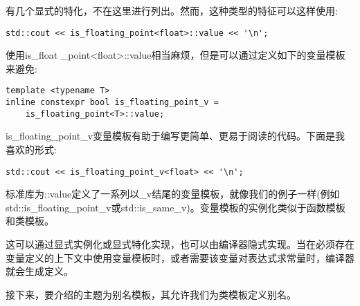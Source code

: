 有几个显式的特化，不在这里进行列出。然而，这种类型的特征可以这样使用:

\begin{lstlisting}[style=styleCXX]
std::cout << is_floating_point<float>::value << '\n';
\end{lstlisting}

使用is\_float \_point<float>::value相当麻烦，但是可以通过定义如下的变量模板来避免:

\begin{lstlisting}[style=styleCXX]
template <typename T>
inline constexpr bool is_floating_point_v =
	is_floating_point<T>::value;
\end{lstlisting}

is\_floating\_point\_v变量模板有助于编写更简单、更易于阅读的代码。下面是我喜欢的形式:

\begin{lstlisting}[style=styleCXX]
std::cout << is_floating_point_v<float> << '\n';
\end{lstlisting}

标准库为::value定义了一系列以\_v结尾的变量模板，就像我们的例子一样(例如std::is\_floating\_point\_v或std::is\_same\_v)。变量模板的实例化类似于函数模板和类模板。

这可以通过显式实例化或显式特化实现，也可以由编译器隐式实现。当在必须存在变量定义的上下文中使用变量模板时，或者需要该变量对表达式求常量时，编译器就会生成定义。

接下来，要介绍的主题为别名模板，其允许我们为类模板定义别名。








